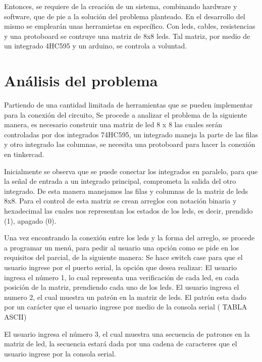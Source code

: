 \documentclass{article}
\begin{document}
Entonces, se requiere de la creación de un sistema, combinando hardware y software, que de pie a la solución del problema planteado. En el desarrollo del mismo se emplearán unas herramietas en específico. Con leds, cables, resistencias y una protoboard se contruye una matriz de 8x8 leds. 
Tal matriz, por medio de un integrado 4HC595 y un arduino, se controla a voluntad. 

\section{Análisis del problema} \label{contenido}
Partiendo de una cantidad limitada de herramientas que se pueden implementar para la conexión del circuito, 
Se procede a analizar el problema de la siguiente manera, es necesario construir una matriz de led 8 x 8 las cuales serán controladas por dos integrados 74HC595, un integrado maneja la parte de las filas y otro integrado las columnas, se necesita una protoboard para hacer la conexión en tinkercad.
\newline

Inicialmente se observa que se puede conectar los integrados en paralelo, para que la señal de entrada a un integrado principal, comprometa la salida del otro integrado. De esta manera manejamos las filas y columnas de la matriz de leds 8x8.
Para el control de esta matriz se crean arreglos con notación binaria y hexadecimal las cuales nos representan los estados de los leds, es decir, prendido (1), apagado (0).
\newline

Una vez encontrando la conexión entre los leds y la forma del arreglo, se procede a programar un menú, para pedir al usuario una opción como se pide en los requisitos del parcial, de la siguiente manera:
Se hace switch case para que el usuario ingrese por el puerto serial, la opción que desea realizar: 
El usuario ingresa el número 1, lo cual representa una verificación de cada led, en cada posición de la matriz, prendiendo cada uno de los leds. 
El usuario ingresa el numero 2, el cual muestra un patrón en la matriz de leds. El patrón esta dado por un carácter que el usuario ingrese por medio de la consola serial ( TABLA ASCII)
\newline

El usuario ingresa el número 3, el cual muestra una secuencia de patrones en la matriz de led, la secuencia estará dada por una cadena de caracteres que el usuario ingrese por la consola serial.
\end{document}
